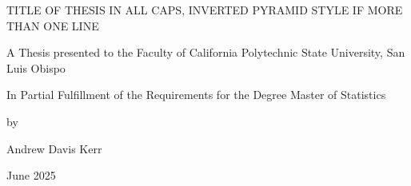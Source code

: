 \begin{center}
\thispagestyle{empty}
\vspace*{1in}

TITLE OF THESIS IN ALL CAPS, INVERTED PYRAMID STYLE IF MORE THAN ONE LINE

\vspace{1in}

A Thesis presented to the Faculty of California Polytechnic State University, San Luis Obispo

\vspace{1in}

In Partial Fulfillment of the Requirements for the Degree Master of Statistics 

\vspace{1in}

by 

Andrew Davis Kerr

June 2025

\end{center}
\clearpage